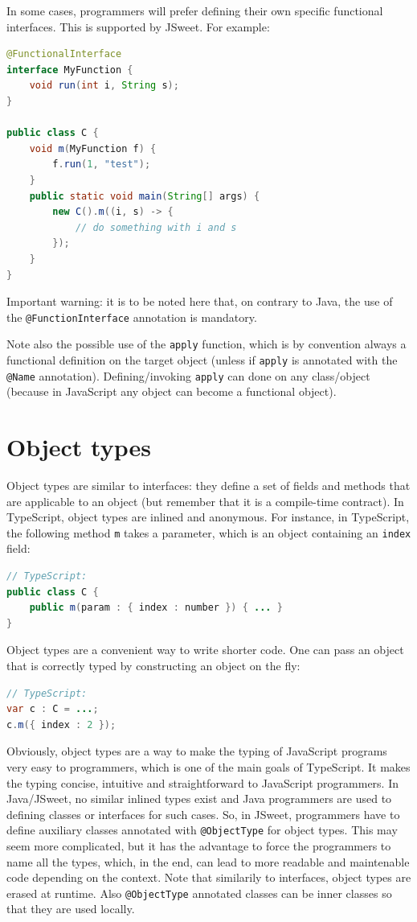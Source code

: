 \documentclass[a4paper]{report}
\begin{document}
In some cases, programmers will prefer defining their own specific functional interfaces. This is supported by JSweet. For example:

\begin{lstlisting}[language=Java]
@FunctionalInterface
interface MyFunction {
	void run(int i, String s);
}

public class C {
	void m(MyFunction f) {
		f.run(1, "test");
	}
	public static void main(String[] args) {
		new C().m((i, s) -> {
			// do something with i and s
		});
	}
}
\end{lstlisting}

Important warning: it is to be noted here that, on contrary to Java, the use of the \texttt{@FunctionInterface} annotation is mandatory. 

Note also the possible use of the \texttt{apply} function, which is by convention always a functional definition on the target object (unless if \texttt{apply} is annotated with the \texttt{@Name} annotation). Defining/invoking \texttt{apply} can done on any class/object (because in JavaScript any object can become a functional object).

\section{Object types}

Object types are similar to interfaces: they define a set of fields and methods that are applicable to an object (but remember that it is a compile-time contract). In TypeScript, object types are inlined and anonymous. For instance, in TypeScript, the following method \texttt{m} takes a parameter, which is an object containing an \texttt{index} field:

\begin{lstlisting}[language=Java]
// TypeScript:
public class C {
	public m(param : { index : number }) { ... }
}
\end{lstlisting}

Object types are a convenient way to write shorter code. One can pass an object that is correctly typed by constructing an object on the fly:

\begin{lstlisting}[language=Java]
// TypeScript:
var c : C = ...;
c.m({ index : 2 });
\end{lstlisting}

Obviously, object types are a way to make the typing of JavaScript programs very easy to programmers, which is one of the main goals of TypeScript. It makes the typing concise, intuitive and straightforward to JavaScript programmers. In Java/JSweet, no similar inlined types exist and Java programmers are used to defining classes or interfaces for such cases. So, in JSweet, programmers have to define auxiliary classes annotated with \texttt{@ObjectType} for object types. This may seem more complicated, but it has the advantage to force the programmers to name all the types, which, in the end, can lead to more readable and maintenable code depending on the context. Note that similarily to interfaces, object types are erased at runtime. Also \texttt{@ObjectType} annotated classes can be inner classes so that they are used locally.
\end{document}
